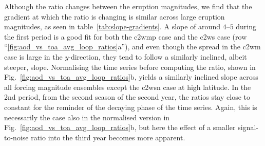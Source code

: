 \documentclass{ametsocV6.1}
\begin{document}
Although the ratio changes between the eruption magnitudes, we find that the gradient at
which the ratio is changing is similar across large eruption magnitudes, as seen in
table~\ref{tab:slope-gradients}. A slope of around \(4\)--\(5\) during the first period
is a good fit for both the \gls{c2wmp} case and the \gls{c2ws} case (row
``\ref{fig:aod_vs_toa_avg_loop_ratios}a''), and even though the spread in the \gls{c2wm}
case is large in the \(y\)-direction, they tend to follow a similarly inclined, albeit
steeper, slope. Normalising the time series before computing the ratio, shown in
Fig.~\ref{fig:aod_vs_toa_avg_loop_ratios}b, yields a similarly inclined slope across all
forcing magnitude ensembles except the \gls{c2wsn} case at high latitude. In the 2nd
period, from the second season of the second year, the ratios stay close to constant for
the reminder of the decaying phase of the time series. Again, this is necessarily the
case also in the normalised version in Fig.~\ref{fig:aod_vs_toa_avg_loop_ratios}b, but
here the effect of a smaller signal-to-noise ratio into the third year becomes more
apparent.
\end{document}
